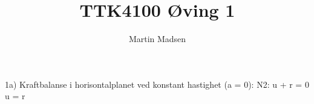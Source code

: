 \documentclass[10pt,a4paper,oneside]{report}
\author{Martin Madsen}
\title{TTK4100 Øving 1}
\begin{document}
1a)
Kraftbalanse i horisontalplanet ved konstant hastighet (a = 0):
N2: 
u + r = 0 \Rightarrow u = r
\end{document}
